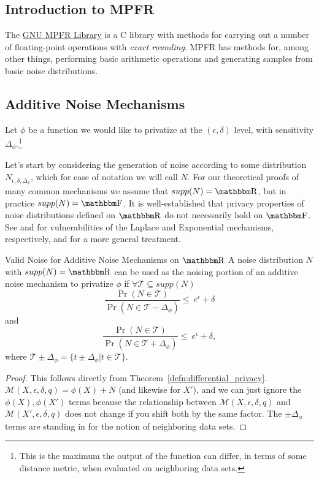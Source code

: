 \documentclass[11pt]{scrartcl} %
\begin{document}
\subsection{Introduction to MPFR}
The \href{https://www.mpfr.org/}{GNU MPFR Library}\cite{FHL+07} is a C library with methods for carrying out a number
of floating-point operations with \emph{exact rounding}.
MPFR has methods for, among other things, performing basic arithmetic operations and generating samples
from basic noise distributions.

\subsection{Additive Noise Mechanisms}
Let $\phi$ be a function we would like to privatize at the $(\epsilon, \delta)$ level,
with sensitivity $\Delta_{\phi}$.\footnote{This is the maximum the output of
the function can differ, in terms of some distance metric, when evaluated on neighboring data sets.} \newline

Let's start by considering the generation of noise according to some distribution $N_{\epsilon, \delta, \Delta_{\phi}}$,
which for ease of notation we will call $N$.
For our theoretical proofs of many common mechanisms we assume that $supp(N) = \R$,
but in practice $supp(N) = \F$. It is well-established that privacy properties
of noise distributions defined on $\R$ do not necessarily hold on $\F$.
See \cite{Mir12} and \cite{Ilv19} for vulnerabilities of the Laplace and Exponential
mechanisms, respectively, and \cite{GMP16} for a more general treatment. \newline

\begin{theorem}
	\label{thm:valid_noise_on_R}
	Valid Noise for Additive Noise Mechanisms on $\R$ \newline
	A noise distribution $N$ with $supp(N) = \R$ can be used as the noising portion of an additive noise mechanism to privatize $\phi$ if
	$\forall \mathcal{T} \subseteq supp(N)$
	\[ \frac{\Pr(N \in \mathcal{T})}{\Pr(N \in \mathcal{T} - \Delta_{\phi})} \leq \ e^{\epsilon} + \delta \]
	and
	\[ \frac{\Pr(N \in \mathcal{T})}{\Pr(N \in \mathcal{T} + \Delta_{\phi})} \leq \ e^{\epsilon} + \delta, \]
	where $\mathcal{T} \pm \Delta_{\phi} = \{t \pm \Delta_{\phi} | t \in \mathcal{T}\}$.

	\begin{proof}
		This follows directly from Theorem~\ref{defn:differential_privacy}.
		$\mathcal{M}(X, \epsilon, \delta, q) = \phi(X) + N$ (and likewise for $X'$),
		and we can just ignore the $\phi(X), \phi(X')$ terms because the relationship between
		$\mathcal{M}(X, \epsilon, \delta, q)$ and $\mathcal{M}(X', \epsilon, \delta, q)$
		does not change if you shift both by the same factor.
		The $\pm \Delta_{\phi}$ terms are standing in for the notion of neighboring data sets.
	\end{proof}
\end{theorem}
\end{document}
